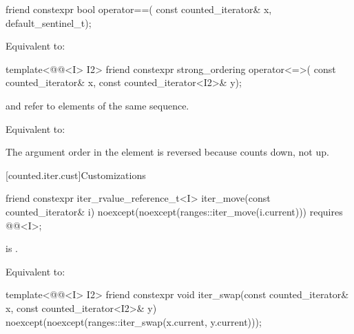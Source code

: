 %
\begin{itemdecl}
friend constexpr bool operator==(
  const counted_iterator& x, default_sentinel_t);
\end{itemdecl}

\begin{itemdescr}
\pnum
\effects
Equivalent to: 
\end{itemdescr}

%
\begin{itemdecl}
template<@@<I> I2>
  friend constexpr strong_ordering operator<=>(
    const counted_iterator& x, const counted_iterator<I2>& y);
\end{itemdecl}

\begin{itemdescr}
\pnum
\expects
{} and  refer to
elements of the same sequence.

\pnum
\effects
Equivalent to: 

\pnum
\begin{note}
The argument order in the \effects element is reversed
because  counts down, not up.
\end{note}
\end{itemdescr}

[counted.iter.cust]{Customizations}

%
\begin{itemdecl}
friend constexpr iter_rvalue_reference_t<I>
  iter_move(const counted_iterator& i)
    noexcept(noexcept(ranges::iter_move(i.current)))
    requires @@<I>;
\end{itemdecl}

\begin{itemdescr}
\pnum
\expects
{} is .

\pnum
\effects
Equivalent to: 
\end{itemdescr}

%
\begin{itemdecl}
template<@@<I> I2>
  friend constexpr void
    iter_swap(const counted_iterator& x, const counted_iterator<I2>& y)
      noexcept(noexcept(ranges::iter_swap(x.current, y.current)));
\end{itemdecl}

